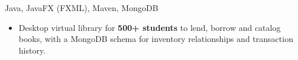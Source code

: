 {}
{Java, JavaFX (FXML), Maven, MongoDB}
{\begin{itemize}
  \item Desktop virtual library for \textbf{500+ students} to lend, borrow and catalog books, with a MongoDB schema for inventory relationships and transaction history.
\end{itemize}}
